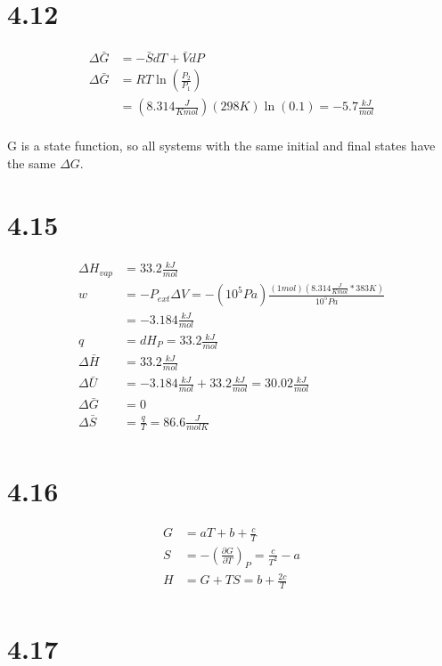\documentclass[10pt]{article} %
\begin{document}
\section{4.12}
\begin{align*}
  \Delta \bar{G} &= -\bar{S}dT + \bar{V}dP\\
  \Delta \bar{G} &= RT\ln\left(\frac{P_2}{P_1}\right)\\
  &= (8.314 \frac{J}{K mol})(298K)\ln(0.1) = -5.7 \frac{kJ}{mol}\\
\end{align*}

G is a state function, so all systems with the same initial and final states have the same $\Delta G$.

\section{4.15}
\begin{align*}
  \Delta H_{vap} &= 33.2 \frac{kJ}{mol}\\
  w &= -P_{ext}\Delta V = -(10^5 Pa)\frac{(1 mol)(8.314 \frac{J}{K mol} * 383 K)}{10^5 Pa}\\
  &= -3.184 \frac{kJ}{mol}\\
  q &= dH_P = 33.2 \frac{kJ}{mol}\\
  \Delta \bar{H} &= 33.2 \frac{kJ}{mol}\\
  \Delta \bar{U} &= -3.184 \frac{kJ}{mol} + 33.2 \frac{kJ}{mol} = 30.02 \frac{kJ}{mol}\\
  \Delta \bar{G} &= 0\\
  \Delta \bar{S} &= \frac{q}{T} = 86.6 \frac{J}{mol K}\\
\end{align*}

\section{4.16}
\begin{align*}
  G &= aT + b + \frac{c}{T}\\
  S &= -\left(\frac{\partial G}{\partial T}\right)_P = \frac{c}{T^2} - a\\
  H &= G + TS = b + \frac{2c}{T}\\
\end{align*}

\section{4.17}
\begin{align*}
  
\end{align*}
\end{document}
